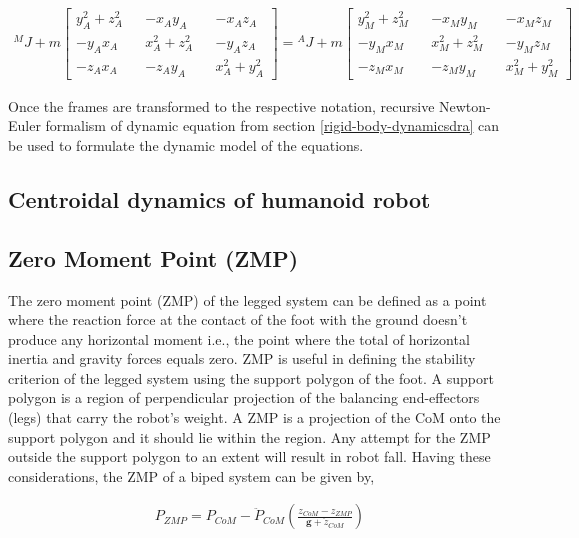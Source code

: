 \begin{align}
    \label{eq: translation-frame}
        {^M}J + m \begin{bmatrix}
            y^2_A + z^2_A && -x_Ay_A && -x_Az_A \\
            -y_Ax_A && x^2_A + z^2_A && -y_Az_A \\
            -z_Ax_A && -z_Ay_A && x^2_A+y^2_A
        \end{bmatrix} = {^A}J + m \begin{bmatrix}
            y^2_M + z^2_M && -x_My_M && -x_Mz_M \\
            -y_Mx_M && x^2_M + z^2_M && -y_Mz_M \\
            -z_Mx_M && -z_My_M && x^2_M+y^2_M
        \end{bmatrix}
\end{align}


Once the frames are transformed to the respective notation, recursive Newton-Euler formalism of dynamic equation from section \ref{rigid-body-dynamicsdra}
can be used to formulate the dynamic model of the equations.

\subsection{Centroidal dynamics of humanoid robot}

\subsection{Zero Moment Point (ZMP)}

The zero moment point (ZMP) of the legged system can be defined as a point where the reaction force at the contact 
of the foot with the ground doesn't produce any horizontal moment i.e., the point where the total of horizontal inertia and
gravity forces equals zero. ZMP is useful in defining the stability criterion of the legged system using the support polygon of 
the foot. A support polygon is a region of perpendicular projection of the balancing end-effectors (legs) that carry the robot's weight.
A ZMP is a projection of the CoM onto the support polygon and it should lie within the region. Any attempt for the ZMP 
outside the support polygon to an extent will result in robot fall. Having these considerations, the ZMP of a biped system
can be given by,

\begin{equation}
    \begin{split}
        P_{ZMP} = P_{CoM} - \ddot{P}_{CoM}(\frac{z_{CoM} - z_{ZMP}}{\mathbf{g} + \ddot{z}_{CoM}})
    \end{split}
\end{equation}

